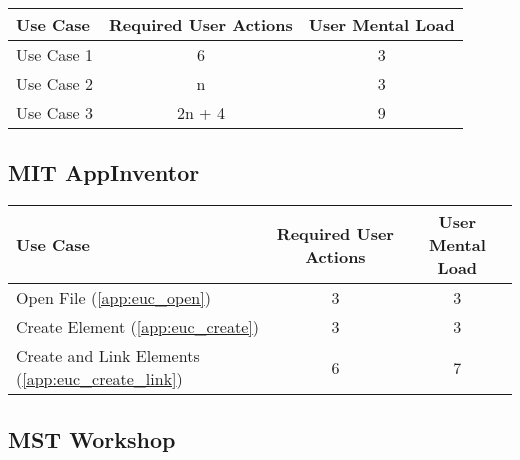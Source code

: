 \begin{tabularx}{\textwidth}{Xcc}
\textbf{Use Case} & \textbf{Required User Actions} & \textbf{User Mental Load}\\
\hline
Use Case 1                          & 6 & 3 \\
Use Case 2                          & n & 3 \\
Use Case 3                          & 2n + 4 & 9
\end{tabularx}

\subsection*{MIT AppInventor}




\begin{tabularx}{\textwidth}{Xcc}
\textbf{Use Case} & \textbf{Required User Actions} & \textbf{User Mental Load}\\
\hline
Open File (\ref{app:euc_open})                       & 3 & 3 \\
Create Element (\ref{app:euc_create})                & 3 & 3 \\
Create and Link Elements (\ref{app:euc_create_link}) & 6 & 7
\end{tabularx}

\subsection*{MST Workshop}

